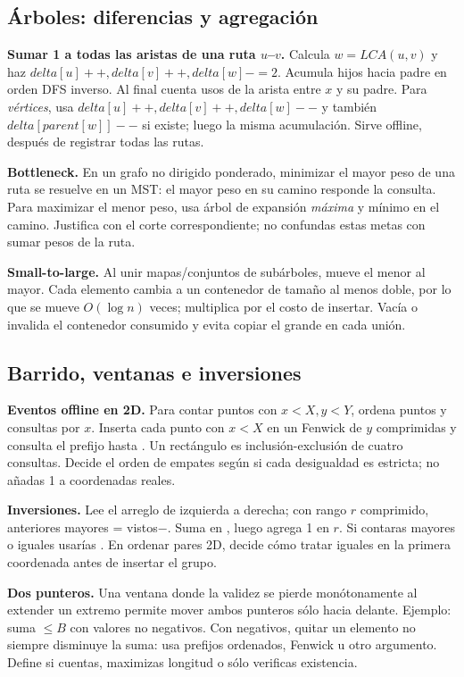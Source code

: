 \subsection{Árboles: diferencias y agregación}
\textbf{Sumar 1 a todas las aristas de una ruta $u$--$v$.} Calcula $w=LCA(u,v)$ y haz $delta[u]++,delta[v]++,delta[w]-=2$. Acumula hijos hacia padre en orden DFS inverso. Al final  cuenta usos de la arista entre $x$ y su padre. Para \emph{vértices}, usa $delta[u]++,delta[v]++,delta[w]--$ y también $delta[parent[w]]--$ si existe; luego la misma acumulación. Sirve offline, después de registrar todas las rutas.

\textbf{Bottleneck.} En un grafo no dirigido ponderado, minimizar el mayor peso de una ruta se resuelve en un MST: el mayor peso en su camino responde la consulta. Para maximizar el menor peso, usa árbol de expansión \emph{máxima} y mínimo en el camino. Justifica con el corte correspondiente; no confundas estas metas con sumar pesos de la ruta.

\textbf{Small-to-large.} Al unir mapas/conjuntos de subárboles, mueve el menor al mayor. Cada elemento cambia a un contenedor de tamaño al menos doble, por lo que se mueve $O(\log n)$ veces; multiplica por el costo de insertar. Vacía o invalida el contenedor consumido y evita copiar el grande en cada unión.

\subsection{Barrido, ventanas e inversiones}
\textbf{Eventos offline en 2D.} Para contar puntos con $x<X,y<Y$, ordena puntos y consultas por $x$. Inserta cada punto con $x<X$ en un Fenwick de $y$ comprimidas y consulta el prefijo hasta . Un rectángulo es inclusión-exclusión de cuatro consultas. Decide el orden de empates según si cada desigualdad es estricta; no añadas 1 a coordenadas reales.

\textbf{Inversiones.} Lee el arreglo de izquierda a derecha; con rango $r$ comprimido, anteriores mayores = vistos$-$. Suma en , luego agrega 1 en $r$. Si contaras mayores o iguales usarías . En ordenar pares 2D, decide cómo tratar iguales en la primera coordenada antes de insertar el grupo.

\textbf{Dos punteros.} Una ventana donde la validez se pierde monótonamente al extender un extremo permite mover ambos punteros sólo hacia delante. Ejemplo: suma $\le B$ con valores no negativos. Con negativos, quitar un elemento no siempre disminuye la suma: usa prefijos ordenados, Fenwick u otro argumento. Define si cuentas, maximizas longitud o sólo verificas existencia.

